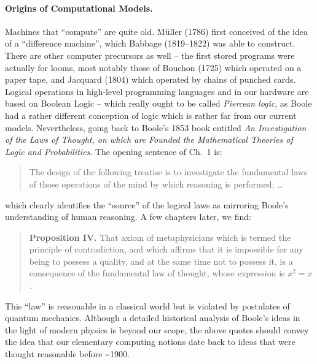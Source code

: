 \documentclass{article}
\begin{document}
\paragraph*{Origins of Computational Models.}
Machines that ``compute'' are quite old. M\"{u}ller (1786) first
conceived of the idea of a ``difference machine'', which Babbage
(1819--1822) was able to construct. There are other computer
precursors as well -- the first stored programs were actually for
looms, most notably those of Bouchon (1725) which operated on a paper
tape, and Jacquard (1804) which operated by chains of punched cards.
Logical operations in high-level programming languages and in our
hardware are based on Boolean Logic -- which really ought to be called
\emph{Piercean logic}, as Boole had a rather different conception of
logic which is rather far from our current models.  Nevertheless,
going back to Boole's 1853 book entitled \emph{An Investigation of the
  Laws of Thought, on which are Founded the Mathematical Theories of
  Logic and Probabilities}. The opening sentence of Ch.~1 is:
\begin{quote}
  The design of the following treatise is to investigate the fundamental laws
  of those operations of the mind by which reasoning is performed; \ldots
\end{quote}
which clearly identifies the ``source'' of the logical laws as
mirroring Boole's understanding of human reasoning. A few chapters
later, we find:
\begin{quote}
  \textbf{Proposition IV.}  That axiom of metaphysicians which is termed the
  principle of contradiction, and which affirms that it is impossible for any
  being to possess a quality, and at the same time not to possess it, is a
  consequence of the fundamental law of thought, whose expression is $x^2 =
  x$.
\end{quote}
This ``law'' is reasonable in a classical world but is violated by
postulates of quantum mechanics. Although a detailed historical
analysis of Boole's ideas in the light of modern physics is beyond our
scope, the above quotes should convey the idea that our elementary
computing notions date back to ideas that were thought reasonable
before \textasciitilde 1900.
\end{document}
